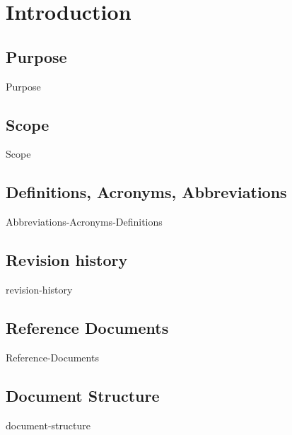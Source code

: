\section{Introduction}

\subsection{Purpose}
{Purpose}

\subsection{Scope}
{Scope}

\subsection{Definitions, Acronyms, Abbreviations}
{Abbreviations-Acronyms-Definitions}


\subsection{Revision history}
{revision-history}

\subsection{Reference Documents}
{Reference-Documents}

\subsection{Document Structure}
{document-structure}
